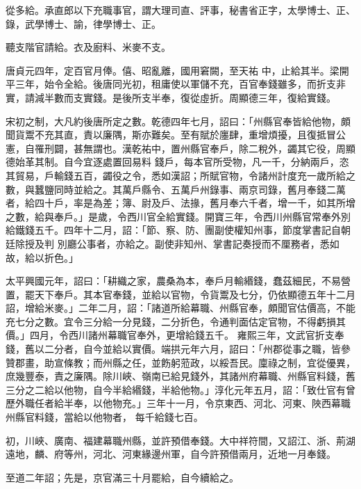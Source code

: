 \begin{pinyinscope}
 從多給。承直郎以下充職事官，謂大理司直、評事，秘書省正字，太學博士、正、錄，武學博士、諭，律學博士、正。



 聽支階官請給。衣及廚料、米麥不支。



 唐貞元四年，定百官月俸。僖、昭亂離，國用窘闕，至天祐
 中，止給其半。梁開平三年，始令全給。後唐同光初，租庸使以軍儲不充，百官奉錢雖多，而折支非實，請減半數而支實錢。是後所支半奉，復從虛折。周顯德三年，復給實錢。



 宋初之制，大凡約後唐所定之數。乾德四年七月，詔曰：「州縣官奉皆給他物，頗聞貨鬻不充其直，責以廉隅，斯亦難矣。至有賦於廛肆，重增煩擾，且復抵冒公憲，自罹刑闢，甚無謂也。漢乾祐中，置州縣官奉戶，除二稅外，蠲其它役，周顯德始革其制。自今宜逐處置回易料
 錢戶，每本官所受物，凡一千，分納兩戶，恣其貿易，戶輸錢五百，蠲役之令，悉如漢詔；所賦官物，令諸州計度充一歲所給之數，與蠶鹽同時並給之。其萬戶縣令、五萬戶州錄事、兩京司錄，舊月奉錢二萬者，給四十戶，率是為差；簿、尉及戶、法掾，舊月奉六千者，增一千，如其所增之數，給與奉戶。」是歲，令西川官全給實錢。開寶三年，令西川州縣官常奉外別給鐵錢五千。四年十二月，詔：「節、察、防、團副使權知州事，節度掌書記自朝廷除授及判
 別廳公事者，亦給之。副使非知州、掌書記奏授而不厘務者，悉如故，給以折色。」



 太平興國元年，詔曰：「耕織之家，農桑為本，奉戶月輸緡錢，蠢茲細民，不易營置，罷天下奉戶。其本官奉錢，並給以官物，令貨鬻及七分，仍依顯德五年十二月詔，增給米麥。」二年二月，詔：「諸道所給幕職、州縣官奉，頗聞官估價高，不能充七分之數。宜令三分給一分見錢，二分折色，令通判面估定官物，不得虧損其價。」四月，令西川諸州幕職官奉外，更增給錢五千。
 雍熙三年，文武官折支奉錢，舊以二分者，自今並給以實價。端拱元年六月，詔曰：「州郡從事之職，皆參贊郡畫，助宣條教；而州縣之任，並飭躬蒞政，以綏吾民。廩祿之制，宜從優異，庶幾豐泰，責之廉隅。除川峽、嶺南已給見錢外，其諸州府幕職、州縣官料錢，舊三分之二給以他物，自今半給緡錢，半給他物。」淳化元年五月，詔：「致仕官有曾歷外職任者給半奉，以他物充。」三年十一月，令京東西、河北、河東、陜西幕職州縣官料錢，當給以他物者，
 每千給錢七百。



 初，川峽、廣南、福建幕職州縣，並許預借奉錢。大中祥符間，又詔江、浙、荊湖遠地，麟、府等州，河北、河東緣邊州軍，自今許預借兩月，近地一月奉錢。



 至道二年詔；先是，京官滿三十月罷給，自今續給之。




\end{pinyinscope}
